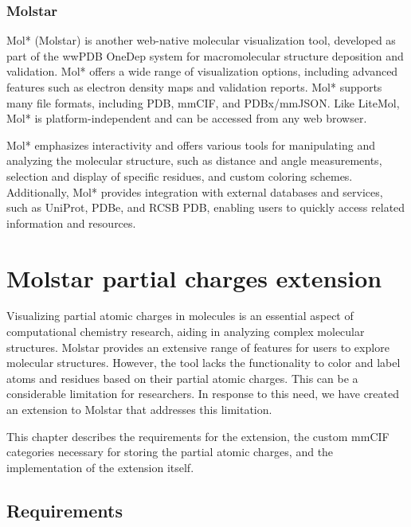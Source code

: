 \documentclass[
  digital,     %
  oneside,     %
  nosansbold,  %
  nocolorbold, %
  lof,         %
  lot,         %
]{fithesis4}
\begin{document}
\subsection{Molstar}
\label{subsection:molstar}

\parencite{sehnal-molstar}

Mol* (Molstar) is another web-native molecular visualization tool, developed as part of the wwPDB OneDep system for macromolecular structure deposition and validation. Mol* offers a wide range of visualization options, including advanced features such as electron density maps and validation reports. Mol* supports many file formats, including PDB, mmCIF, and PDBx/mmJSON. Like LiteMol, Mol* is platform-independent and can be accessed from any web browser.

Mol* emphasizes interactivity and offers various tools for manipulating and analyzing the molecular structure, such as distance and angle measurements, selection and display of specific residues, and custom coloring schemes. Additionally, Mol* provides integration with external databases and services, such as UniProt, PDBe, and RCSB PDB, enabling users to quickly access related information and resources.

\chapter{Molstar partial charges extension}
\label{chapter:molstar_partial_charges_extension}

Visualizing partial atomic charges in molecules is an essential aspect of computational chemistry research, aiding in analyzing complex molecular structures. Molstar provides an extensive range of features for users to explore molecular structures. However, the tool lacks the functionality to color and label atoms and residues based on their partial atomic charges. This can be a considerable limitation for researchers. In response to this need, we have created an extension to Molstar that addresses this limitation.

This chapter describes the requirements for the extension, the custom mmCIF categories necessary for storing the partial atomic charges, and the implementation of the extension itself.

\section{Requirements}
\label{section:requirements}
\end{document}
